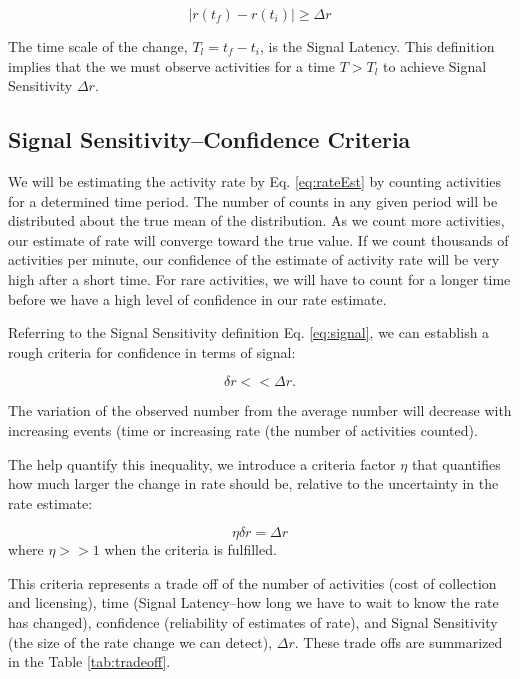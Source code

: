\documentclass{article}
\begin{document}
\begin{equation}
    \label{eq:signal}
    | r(t_f) - r(t_i) | \geq \Delta r
\end{equation}

The time scale of the change, $T_l = t_f - t_i$, is the Signal Latency.  This definition implies that the we must observe activities for a time $T > T_l$ to achieve Signal Sensitivity $\Delta r$.

\subsection{Signal Sensitivity--Confidence Criteria} 

We will be estimating the activity rate by Eq. \ref{eq:rateEst} by counting activities for a determined time period.  The number of counts in any given period will be distributed about the true mean of the distribution. As we count more activities, our estimate of rate will converge toward the true value.  If we count thousands of activities per minute, our confidence of the estimate of activity rate will be very high after a short time.  For rare activities, we will have to count for a longer time before we have a high level of confidence in our rate estimate.

Referring to the Signal Sensitivity definition Eq. \ref{eq:signal}, we can establish a rough criteria for confidence in terms of signal: 

\begin{equation}
    \label{eq:criteria}
    \delta r << \Delta r.
\end{equation}

The variation of the observed number from the average number will decrease with increasing events (time or increasing rate (the number of activities counted).

The help quantify this inequality, we introduce a criteria factor $\eta$ that quantifies how much larger the change in rate should be, relative to the uncertainty in the rate estimate:

\begin{equation}
    \label{eq:criteriaParam}
    \eta \delta r = \Delta r
\end{equation}
where $\eta >> 1$ when the criteria is fulfilled.

This criteria represents a trade off of the number of activities (cost of collection and licensing), time (Signal Latency--how long we have to wait to know the rate has changed), confidence (reliability of estimates of rate), and Signal Sensitivity (the size of the rate change we can detect), $\Delta r$. These trade offs are summarized in the Table \ref{tab:tradeoff}.
\end{document}
